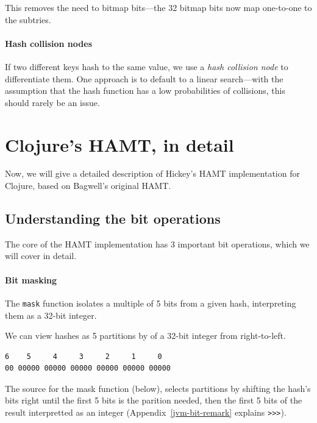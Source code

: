 \documentclass[preprint]{sigplanconf}
\begin{document}
This removes the need to bitmap bits---the
32 bitmap bits now map one-to-one to the subtries.

\paragraph{Hash collision nodes}
If two different keys hash to the same value,
we use a \textit{hash collision node}
to differentiate them. One approach
is to default to a linear search---with
the assumption that the hash function
has a low probabilities of collisions,
this should rarely be an issue.


\section{Clojure's HAMT, in detail}
\label{clojure-hamt}

Now, we will give a detailed description of
Hickey's HAMT implementation for Clojure, based
on Bagwell's original HAMT.

\subsection{Understanding the bit operations}

The core of the HAMT implementation has 3 important
bit operations, which we will cover in detail.

\paragraph{Bit masking}

The \texttt{mask} function isolates a multiple of
5 bits from a given hash, interpreting them as
a 32-bit integer.

We can view hashes as 5 partitions
by of a 32-bit integer from right-to-left.

\begin{verbatim}
6    5     4     3     2     1     0
00 00000 00000 00000 00000 00000 00000
\end{verbatim}

The source for the mask function (below),
selects partitions
by
shifting the hash's bits right until the first
5 bits is the parition needed, then the 
first 5 bits of the result
interpretted as an integer
(Appendix~\ref{jvm-bit-remark} explains \texttt{>>>}).
\end{document}
